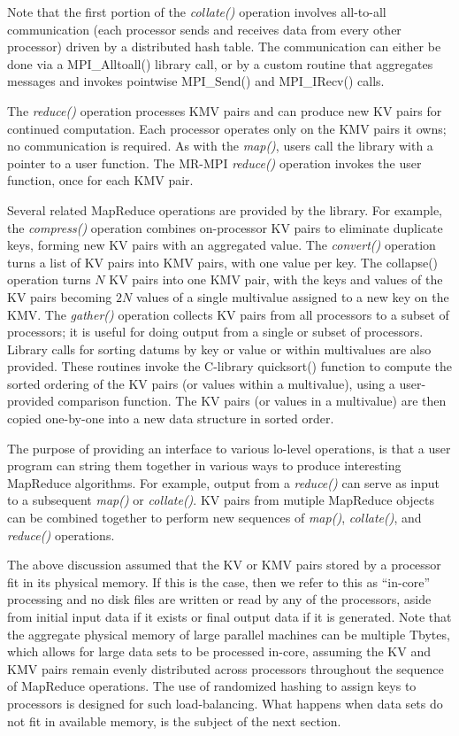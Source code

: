 Note that the first portion of the {\it collate()} operation involves
all-to-all communication (each processor sends and receives data from
every other processor) driven by a distributed hash table.  The
communication can either be done via a MPI\_Alltoall() library call,
or by a custom routine that aggregates messages and invokes pointwise
MPI\_Send() and MPI\_IRecv() calls.

The {\it reduce()} operation processes KMV pairs and can produce new
KV pairs for continued computation.  Each processor operates only on
the KMV pairs it owns; no communication is required.  As with the {\it
map()}, users call the library with a pointer to a user function.  The
MR-MPI {\it reduce()} operation invokes the user function, once for
each KMV pair.

Several related MapReduce operations are provided by the library.  For
example, the {\it compress()} operation combines on-processor KV pairs
to eliminate duplicate keys, forming new KV pairs with an aggregated
value.  The { \it convert()} operation turns a list of KV pairs into
KMV pairs, with one value per key.  The {collapse()} operation turns
$N$ KV pairs into one KMV pair, with the keys and values of the KV
pairs becoming $2N$ values of a single multivalue assigned to a new
key on the KMV.  The {\it gather()} operation collects KV pairs from
all processors to a subset of processors; it is useful for doing
output from a single or subset of processors.  Library calls for
sorting datums by key or value or within multivalues are also
provided.  These routines invoke the C-library quicksort() function to
compute the sorted ordering of the KV pairs (or values within a
multivalue), using a user-provided comparison function.  The KV pairs
(or values in a multivalue) are then copied one-by-one into a new data
structure in sorted order.

The purpose of providing an interface to various lo-level operations,
is that a user program can string them together in various ways to
produce interesting MapReduce algorithms.  For example, output from a
{\it reduce()} can serve as input to a subsequent {\it map()} or {\it
collate()}.  KV pairs from mutiple MapReduce objects can be combined
together to perform new sequences of {\it map()}, {\it collate()}, and
{\it reduce()} operations.

The above discussion assumed that the KV or KMV pairs stored by a
processor fit in its physical memory.  If this is the case, then we
refer to this as ``in-core'' processing and no disk files are written
or read by any of the processors, aside from initial input data if it
exists or final output data if it is generated.  Note that the
aggregate physical memory of large parallel machines can be multiple
Tbytes, which allows for large data sets to be processed in-core,
assuming the KV and KMV pairs remain evenly distributed across
processors throughout the sequence of MapReduce operations.  The use
of randomized hashing to assign keys to processors is designed for
such load-balancing.  What happens when data sets do not
fit in available memory, is the subject of the next section.
